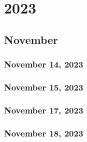 \part{2023}
\chapter{November}
\section{November 14, 2023}


\section{November 15, 2023}


\section{November 17, 2023}


\section{November 18, 2023}




